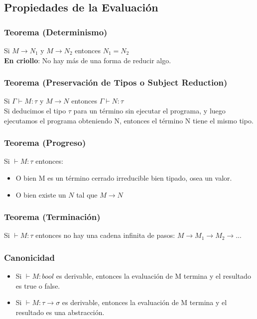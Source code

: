 \documentclass[10pt,a4paper]{article}
\begin{document}
\subsection{Propiedades de la Evaluación}
\subsubsection{Teorema (Determinismo)}
Si $M \rightarrow N_{1}$ y $M \rightarrow N_{2}$ entonces $N_{1} = N_{2}$ \\
\textbf{En criollo}: No hay más de una forma de reducir algo. 
\subsubsection{Teorema (Preservación de Tipos o Subject Reduction)}
Si $\Gamma \vdash M : \tau$ y $M \rightarrow N$ entonces $\Gamma \vdash N:\tau$ \\
Si deducimos el tipo $\tau$ para un término sin ejecutar el programa, y luego ejecutamos el programa obteniendo N, entonces el término N tiene el mismo tipo. 
\subsubsection{Teorema (Progreso)}
Si $\vdash M:\tau$ entonces: 
\begin{itemize}
    \item O bien M es un término cerrado irreducible bien tipado, osea un valor. 
    \item O bien existe un $N$ tal que $M \rightarrow N$
\end{itemize}
\subsubsection{Teorema (Terminación)}
Si $\vdash M:\tau$ entonces no hay una cadena infinita de pasos: $M \rightarrow M_{1} \rightarrow M_{2} \rightarrow ...$
\subsubsection{Canonicidad}
\begin{itemize}
    \item Si $\vdash M:bool$ es derivable, entonces la evaluación de M termina y el resultado es true o false.
    \item Si $\vdash M:\tau \rightarrow \sigma$ es derivable, entonces la evaluación de M termina y el resultado es una abstracción. 
\end{itemize}
\end{document}
